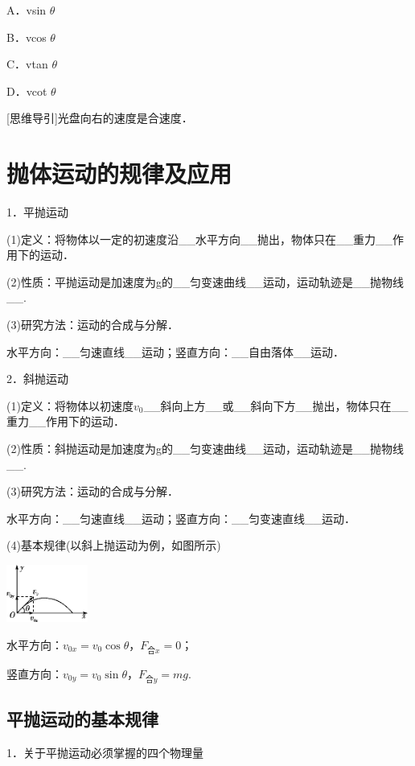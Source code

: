 \documentclass[cn,10.5pt,chinese,mac,chinesefont=founder]{elegantbook}
\begin{document}
A．vsin $\theta$ 

B．vcos $\theta$

C．vtan $\theta$ 

D．vcot $\theta$

{[}思维导引{]}光盘向右的速度是合速度．


\newpage
\section{抛体运动的规律及应用}


1．平抛运动

(1)定义：将物体以一定的初速度沿\_\_水平方向\_\_抛出，物体只在\_\_重力\_\_作用下的运动．

(2)性质：平抛运动是加速度为g的\_\_匀变速曲线\_\_运动，运动轨迹是\_\_抛物线\_\_.

(3)研究方法：运动的合成与分解．

水平方向：\_\_匀速直线\_\_运动；竖直方向：\_\_自由落体\_\_运动．

2．斜抛运动

(1)定义：将物体以初速度$v_0$\_\_斜向上方\_\_或\_\_斜向下方\_\_抛出，物体只在\_\_重力\_\_作用下的运动．

(2)性质：斜抛运动是加速度为g的\_\_匀变速曲线\_\_运动，运动轨迹是\_\_抛物线\_\_.

(3)研究方法：运动的合成与分解．

水平方向：\_\_匀速直线\_\_运动；竖直方向：\_\_匀变速直线\_\_运动．

(4)基本规律(以斜上抛运动为例，如图所示)

\begin{center}\includegraphics[width=1.05208in,height=0.73958in]{media/image160.png}\end{center}

水平方向：$v_{0x}=v_0\cos\theta$，$F_{\text{合}x}=0$；

竖直方向：$v_{0y}=v_0\sin\theta$，$F_{\text{合}y}=mg$.

\newpage
\subsection{平抛运动的基本规律}

1．关于平抛运动必须掌握的四个物理量
\end{document}
